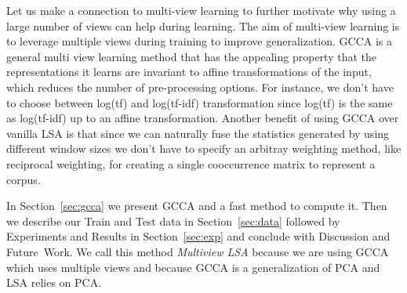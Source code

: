 Let us make a connection to multi-view learning to further motivate
why using a large number of views can help during learning. The aim of
multi-view learning is to leverage multiple views during training to
improve generalization. GCCA is a general multi view learning method that has the appealing
property that the representations it learns are invariant to affine
transformations of the input, which reduces the number of
pre-processing options. For instance, we don't have to choose 
between log(tf) and log(tf-idf) transformation since log(tf) is the
same as log(tf-idf) up to an affine transformation. Another benefit of
using GCCA over vanilla LSA is that since we can naturally 
fuse the statistics generated by using different window sizes we
don't have to specify an arbitray weighting method, like reciprocal
weighting, for creating a single cooccurrence matrix to represent a
corpus.



In Section~\ref{sec:gcca} we present GCCA and a fast method to
compute it. 
Then we describe our Train and Test data in
Section~\ref{sec:data} followed by Experiments and Results in
Section~\ref{sec:exp} and conclude with Discussion and Future~Work. 
We call this method \textit{Multiview LSA} because we are using GCCA
which uses multiple views and because GCCA is a generalization of PCA and LSA
relies on PCA. 
